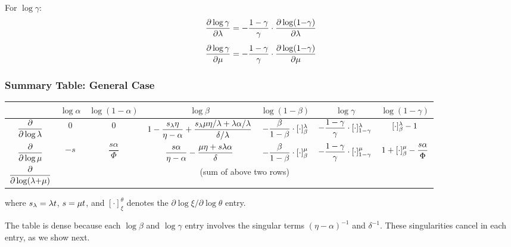 For $\log\gamma$:
\begin{align}
\frac{\partial\log\gamma}{\partial\lambda}
  &= -\frac{1-\gamma}{\gamma}
     \cdot\frac{\partial\log(1{-}\gamma)}{\partial\lambda}
\label{eq:dloggamma-dl}
\\[4pt]
\frac{\partial\log\gamma}{\partial\mu}
  &= -\frac{1-\gamma}{\gamma}
     \cdot\frac{\partial\log(1{-}\gamma)}{\partial\mu}
\label{eq:dloggamma-dm}
\end{align}


\subsubsection{Summary Table: General Case}
\label{sec:score-table-general}

\begin{center}
\renewcommand{\arraystretch}{1.6}
\begin{tabular}{c|cccccc}
& $\log\alpha$ & $\log(1{-}\alpha)$
& $\log\beta$ & $\log(1{-}\beta)$
& $\log\gamma$ & $\log(1{-}\gamma)$ \\
\hline
$\dfrac{\partial}{\partial\log\lambda}$
  & $0$
  & $0$
  & $1 - \dfrac{s_\lambda \eta}{\eta-\alpha}
        + \dfrac{s_\lambda\mu\eta/\lambda + \lambda\alpha/\lambda}{\delta/\lambda}$
  & $-\dfrac{\beta}{1-\beta}\cdot[\cdot]_\beta^\lambda$
  & $-\dfrac{1-\gamma}{\gamma}\cdot[\cdot]_{1-\gamma}^\lambda$
  & $[\cdot]_\beta^\lambda - 1$
\\[6pt]
$\dfrac{\partial}{\partial\log\mu}$
  & $-s$
  & $\dfrac{s\alpha}{\Phi}$
  & $\dfrac{s\alpha}{\eta-\alpha} - \dfrac{\mu\eta + s\lambda\alpha}{\delta}$
  & $-\dfrac{\beta}{1-\beta}\cdot[\cdot]_\beta^\mu$
  & $-\dfrac{1-\gamma}{\gamma}\cdot[\cdot]_{1-\gamma}^\mu$
  & $1 + [\cdot]_\beta^\mu - \dfrac{s\alpha}{\Phi}$
\\[6pt]
$\dfrac{\partial}{\partial\log(\lambda{+}\mu)}$
  & \multicolumn{6}{c}{(sum of above two rows)}
\end{tabular}
\end{center}

\noindent
where $s_\lambda = \lambda t$, $s = \mu t$,
and $[\cdot]_\xi^\theta$ denotes the $\partial\log\xi/\partial\log\theta$ entry.

The table is dense because each $\log\beta$ and $\log\gamma$ entry
involves the singular terms $(\eta-\alpha)^{-1}$ and $\delta^{-1}$.
These singularities cancel in each entry, as we show next.



